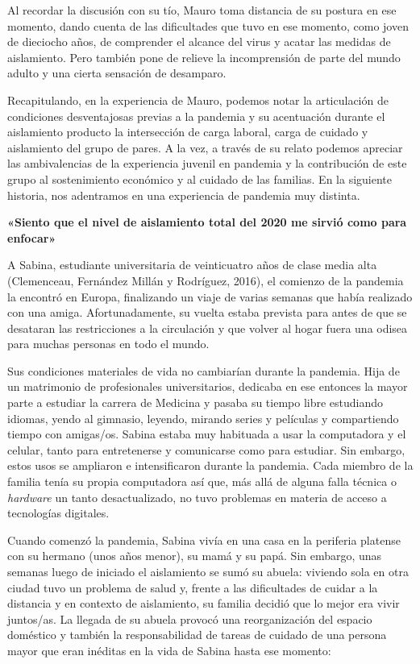 Al recordar la discusión con su tío, Mauro toma distancia de su postura en ese momento, dando cuenta de las dificultades que tuvo en ese momento, como joven de dieciocho años, de comprender el alcance del virus y acatar las medidas de aislamiento. Pero también pone de relieve la incomprensión de parte del mundo adulto y una cierta sensación de desamparo.

Recapitulando, en la experiencia de Mauro, podemos notar la articulación de condiciones desventajosas previas a la pandemia y su acentuación durante el aislamiento producto la intersección de carga laboral, carga de cuidado y aislamiento del grupo de pares. A la vez, a través de su relato podemos apreciar las ambivalencias de la experiencia juvenil en pandemia y la contribución de este grupo al sostenimiento económico y al cuidado de las familias. En la siguiente historia, nos adentramos en una experiencia de pandemia muy distinta.

\textbf{«Siento que el nivel de aislamiento total del 2020 me sirvió como para enfocar»}

A Sabina, estudiante universitaria de veinticuatro años de clase media alta (Clemenceau, Fernández Millán y Rodríguez, 2016), el comienzo de la pandemia la encontró en Europa, finalizando un viaje de varias semanas que había realizado con una amiga. Afortunadamente, su vuelta estaba prevista para antes de que se desataran las restricciones a la circulación y que volver al hogar fuera una odisea para muchas personas en todo el mundo.

Sus condiciones materiales de vida no cambiarían durante la pandemia. Hija de un matrimonio de profesionales universitarios, dedicaba en ese entonces la mayor parte a estudiar la carrera de Medicina y pasaba su tiempo libre estudiando idiomas, yendo al gimnasio, leyendo, mirando series y películas y compartiendo tiempo con amigas/os. Sabina estaba muy habituada a usar la computadora y el celular, tanto para entretenerse y comunicarse como para estudiar. Sin embargo, estos usos se ampliaron e intensificaron durante la pandemia. Cada miembro de la familia tenía su propia computadora así que, más allá de alguna falla técnica o \emph{hardware} un tanto desactualizado, no tuvo problemas en materia de acceso a tecnologías digitales.

Cuando comenzó la pandemia, Sabina vivía en una casa en la periferia platense con su hermano (unos años menor), su mamá y su papá. Sin embargo, unas semanas luego de iniciado el aislamiento se sumó su abuela: viviendo sola en otra ciudad tuvo un problema de salud y, frente a las dificultades de cuidar a la distancia y en contexto de aislamiento, su familia decidió que lo mejor era vivir juntos/as. La llegada de su abuela provocó una reorganización del espacio doméstico y también la responsabilidad de tareas de cuidado de una persona mayor que eran inéditas en la vida de Sabina hasta ese momento:

